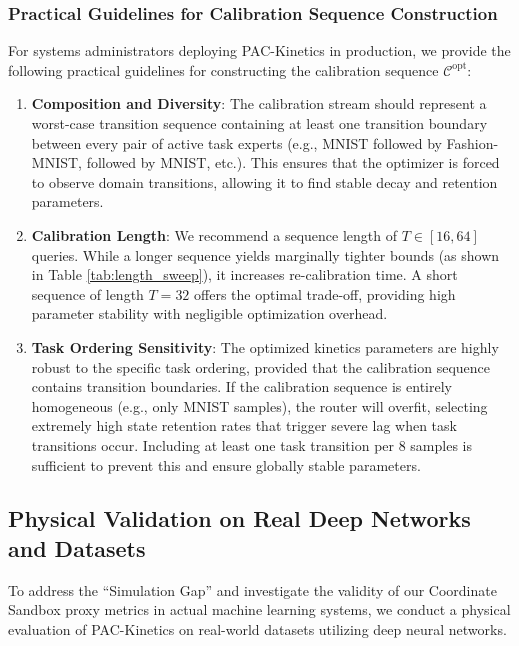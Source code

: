 \subsubsection{Practical Guidelines for Calibration Sequence Construction}
For systems administrators deploying \textsf{PAC-Kinetics} in production, we provide the following practical guidelines for constructing the calibration sequence $\mathcal{C}^{\text{opt}}$:
\begin{enumerate}
    \item \textbf{Composition and Diversity}: The calibration stream should represent a worst-case transition sequence containing at least one transition boundary between every pair of active task experts (e.g., MNIST followed by Fashion-MNIST, followed by MNIST, etc.). This ensures that the optimizer is forced to observe domain transitions, allowing it to find stable decay and retention parameters.
    \item \textbf{Calibration Length}: We recommend a sequence length of $T \in [16, 64]$ queries. While a longer sequence yields marginally tighter bounds (as shown in Table \ref{tab:length_sweep}), it increases re-calibration time. A short sequence of length $T=32$ offers the optimal trade-off, providing high parameter stability with negligible optimization overhead.
    \item \textbf{Task Ordering Sensitivity}: The optimized kinetics parameters are highly robust to the specific task ordering, provided that the calibration sequence contains transition boundaries. If the calibration sequence is entirely homogeneous (e.g., only MNIST samples), the router will overfit, selecting extremely high state retention rates that trigger severe lag when task transitions occur. Including at least one task transition per 8 samples is sufficient to prevent this and ensure globally stable parameters.
\end{enumerate}

\subsection{Physical Validation on Real Deep Networks and Datasets}
To address the ``Simulation Gap'' and investigate the validity of our Coordinate Sandbox proxy metrics in actual machine learning systems, we conduct a physical evaluation of \textsf{PAC-Kinetics} on real-world datasets utilizing deep neural networks.


